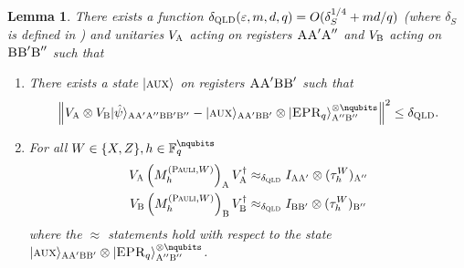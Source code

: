 \documentclass[11pt]{article}
\newtheorem{lemma}[theorem]{Lemma}
\theoremstyle{definition}
\newcommand{\ket}[1]{|#1\rangle}
\newcommand{\Id}{\ensuremath{I}}
\newcommand{\F}{\ensuremath{\mathbb{F}}}
\newcommand{\eps}{\varepsilon}
\newcommand{\gamestyle}[1]{\ensuremath{\textsc{#1}}\xspace}
\newcommand{\qld}{\gamestyle{QLD}}
\newcommand{\labelstyle}[1]{\ensuremath{\textsc{#1}}\xspace}
\newcommand{\EPR}{\labelstyle{EPR}}
\newcommand{\aux}{\labelstyle{aux}}
\newcommand{\alice}{\labelstyle{A}}
\newcommand{\bob}{\labelstyle{B}}
\newcommand{\typestyle}[1]{\ensuremath{\textsc{#1}}\xspace}
\newcommand{\Pauli}{\typestyle{Pauli}}
\begin{document}
\begin{lemma}
\label{lem:qld-unitary}
There exists a function $\delta_\qld(\eps,m,d,q) = O(\delta_S^{1/4} + md/q)$ (where $\delta_S$ is defined in ) and unitaries $V_\alice$ acting on registers $\alice \alice' \alice''$ and $V_\bob$ acting on $\bob \bob' \bob''$ such that 
\begin{enumerate}
	\item There exists a state $\ket{\aux}$ on registers $\alice \alice' \bob \bob'$ such that
	\[
		\left \| V_\alice \otimes V_\bob \ket{\hat{\psi}}_{\alice \alice' \alice'' \bob \bob' \bob''} - \ket{\aux}_{\alice \alice' \bob \bob'} \otimes \ket{\EPR_q}^{\otimes \nqubits}_{\alice'' \bob''} \right \|^2 \leq \delta_\qld.
	\]
	
	\item For all $W \in \{X,Z\}, h \in \F_q^\nqubits$
	\begin{align*}
		V_\alice \, \Big(M^{(\Pauli,W)}_h \Big)_{\alice} \, V_\alice^\dagger &\approx_{\delta_\qld} \Id_{\alice \alice'} \otimes (\tau^W_h)_{\alice''} \\
		 V_\bob \, \Big(M^{(\Pauli,W)}_h  \Big)_{\bob}\, V_\bob^\dagger &\approx_{\delta_\qld} \Id_{\bob \bob'} \otimes (\tau^W_h)_{\bob''}
	\end{align*}
	where the $\approx$ statements hold with respect to the state $\ket{\aux}_{\alice \alice' \bob \bob'} \otimes \ket{\EPR_q}^{\otimes \nqubits}_{\alice'' \bob''}$. 
\end{enumerate}
\end{lemma}
\end{document}
